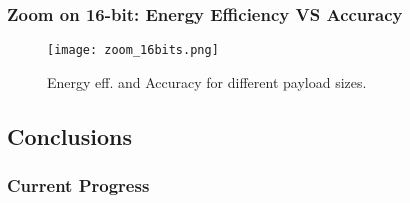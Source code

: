 \begin{frame}
    \frametitle{Zoom on 16-bit: Energy Efficiency VS Accuracy}
     \begin{figure}
         \centering
         \texttt{[image: zoom\_16bits.png]}
         \caption{Energy eff. and Accuracy for different payload sizes.}
         \label{fig:accuracy}
     \end{figure}

\end{frame}

\subsection{Conclusions}
\begin{frame}
    \frametitle{Current Progress}

    \tableofcontents[currentsection,
                     subsectionstyle=show/shaded/hide,
                     sectionstyle=show/hide]

\end{frame}

